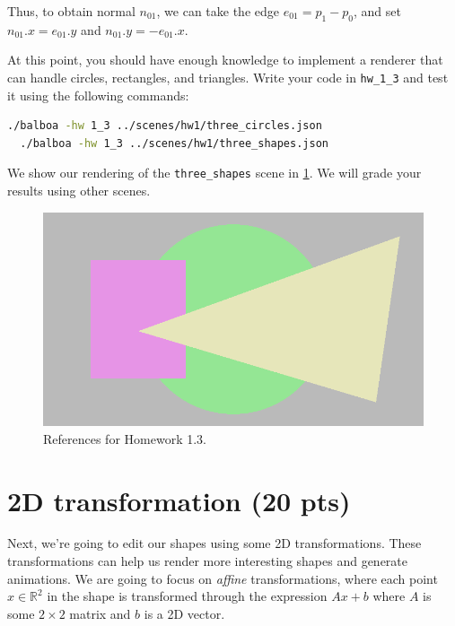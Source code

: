 Thus, to obtain normal $n_{01}$, we can take the edge $e_{01} = p_1 - p_0$, and set $n_{01}.x = e_{01}.y$ and $n_{01}.y = -e_{01}.x$.

At this point, you should have enough knowledge to implement a renderer that can handle circles, rectangles, and triangles. Write your code in \lstinline{hw_1_3} and test it using the following commands:
\begin{lstlisting}[language=bash]
  ./balboa -hw 1_3 ../scenes/hw1/three_circles.json
  ./balboa -hw 1_3 ../scenes/hw1/three_shapes.json
\end{lstlisting}

We show our rendering of the \lstinline{three_shapes} scene in \cref{fig:hw1_3}. We will grade your results using other scenes.

\begin{figure}[ht]
    \centering
    \includegraphics[width=0.5\linewidth]{imgs/hw_1_3.png}
    \caption{References for Homework 1.3.}
    \label{fig:hw1_3}
\end{figure}

\section{2D transformation (20 pts)}

Next, we're going to edit our shapes using some 2D transformations. These transformations can help us render more interesting shapes and generate animations. We are going to focus on \emph{affine} transformations, where each point $x \in \mathbb{R}^2$ in the shape is transformed through the expression $Ax + b$ where $A$ is some $2 \times 2$ matrix and $b$ is a 2D vector. 

